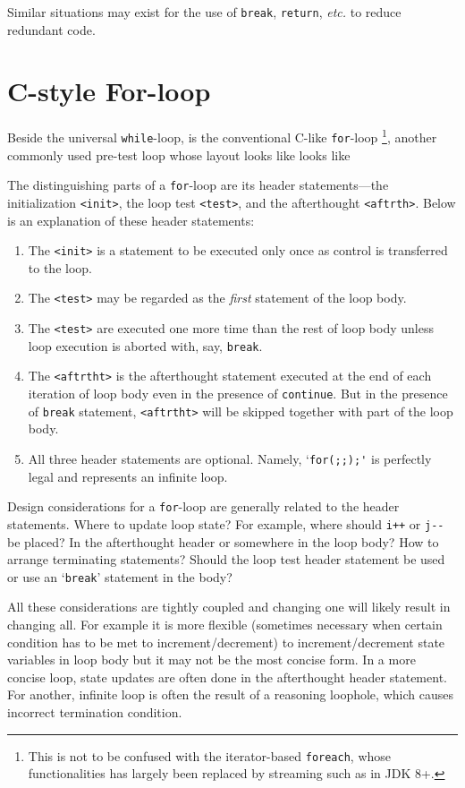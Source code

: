 \documentclass[oneside,11pt]{book}
\theoremstyle{definition}
\theoremstyle{remark}
\newcommand{\code}[1]{\mbox{\lstinline{#1}}}
\begin{document}
Similar situations may exist for the use of \code{break}, \code{return}, \textit{etc.} to reduce
redundant code.


\section{C-style For-loop}\label{sec:for-loop}

Beside the universal \code{while}-loop, is the conventional C-like \code{for}-loop
\footnote{This is not to be confused with the iterator-based \code{foreach},
whose functionalities has largely been replaced by streaming such as in JDK 8+.},
another commonly used pre-test loop whose layout looks like looks like

The distinguishing parts of a \code{for}-loop are its header statements---the
initialization \code{<init>}, the loop test \code{<test>}, and the afterthought \code{<aftrth>}.
Below is an explanation of these header statements:
\begin{enumerate}
    \item The \code{<init>} is a statement to be executed only once as control is transferred to
    the loop.
    \item The \code{<test>} may be regarded as the \emph{first} statement of the loop body.
    \item The \code{<test>} are executed one more time than the rest of loop body
    unless loop execution is aborted with, say, \code{break}.
    \item The \code{<aftrtht>} is the afterthought statement executed at the end of each
    iteration of loop body even in the presence of \code{continue}.
    But in the presence of \code{break} statement, \code{<aftrtht>} will be skipped together with
    part of the loop body.
    \item All three header statements are optional.
    Namely, `\code{for(;;);'} is perfectly legal and represents an infinite loop.
\end{enumerate}


Design considerations for a \code{for}-loop are generally related to the header statements.
Where to update loop state?
For example, where should \code{i++} or \code{j--} be placed?
In the afterthought header or somewhere in the loop body?
How to arrange terminating statements?
Should the loop test header statement be used or use an `\code{break}' statement in the body?


All these considerations are tightly coupled and changing one will likely result in changing all.
For example it is more flexible (sometimes necessary when certain condition
has to be met to increment/decrement)
to increment/decrement state variables in loop body but it may not be the most concise form.
In a more concise loop, state updates are often done in the afterthought header statement.
For another, infinite loop is often the result of a reasoning loophole,
which causes incorrect termination condition.
\end{document}
